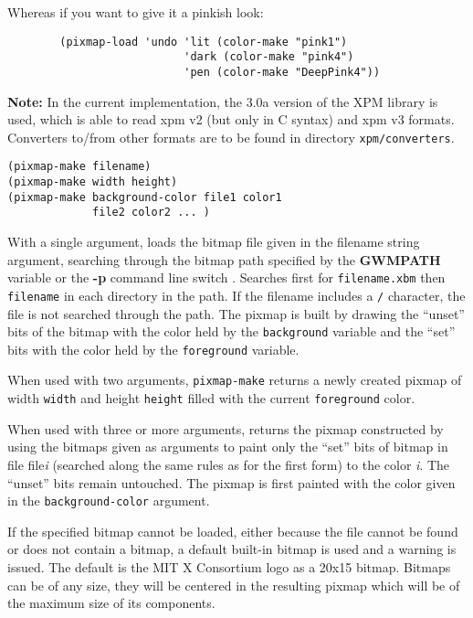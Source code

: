 Whereas if you want to give it a pinkish look:

{\exemplefont\begin{verbatim}
        (pixmap-load 'undo 'lit (color-make "pink1")
                           'dark (color-make "pink4")
                           'pen (color-make "DeepPink4"))
\end{verbatim}}


{\bf Note:} In the current implementation, the 3.0a version of the XPM library
is used, which is able to  read xpm v2 (but only in C syntax) and xpm v3
formats. Converters to/from other formats are to be found in directory
\verb|xpm/converters|.

        
{\usagefont\begin{verbatim}
(pixmap-make filename)
(pixmap-make width height)
(pixmap-make background-color file1 color1 
             file2 color2 ... )
\end{verbatim}}\usageupspace

With a single argument, loads the bitmap file given in the filename string
argument, searching through the bitmap path specified by the {\bf GWMPATH}
variable or the {\bf -p} command line switch . 
Searches first for
\verb"filename.xbm" then \verb"filename" in each directory in the path. If
the filename includes a \verb"/" character, the file is not searched through
the path.
The pixmap is built by drawing the ``unset'' bits of the bitmap with the 
color held by the \verb"background" variable and  the ``set'' bits with
the color held by the \verb"foreground" variable.

When used with two arguments, \verb"pixmap-make" returns a newly
created pixmap of width \verb"width" and height \verb"height" filled with
the current \verb"foreground" color.

When used with three or more arguments,
returns the pixmap constructed by using the bitmaps given as arguments to
paint only the ``set'' bits of bitmap in file file{\it i}
(searched along the same rules as for the first form) to the color{\it
i}.  The ``unset'' bits remain untouched. The pixmap is first painted with the
color given in the \verb"background-color" argument.

If the specified bitmap cannot be loaded, either because the file cannot be
found or does not contain a bitmap, a default built-in bitmap is used and a
warning is issued. The default is the MIT X Consortium logo as a 20x15 bitmap.
Bitmaps can be of any size, they will be centered in the resulting pixmap
which will be of the maximum size of its components.

